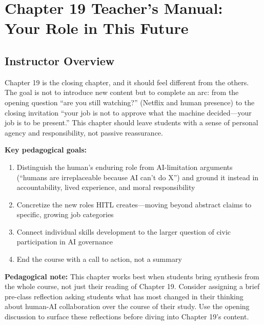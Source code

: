 
\section*{Chapter 19 Teacher's Manual: Your Role in This Future}

\subsection*{Instructor Overview}

Chapter 19 is the closing chapter, and it should feel different from the others. The goal is not to introduce new content but to complete an arc: from the opening question ``are you still watching?'' (Netflix and human presence) to the closing invitation ``your job is not to approve what the machine decided---your job is to be present.'' This chapter should leave students with a sense of personal agency and responsibility, not passive reassurance.

\textbf{Key pedagogical goals:}
\begin{enumerate}
    \item Distinguish the human's enduring role from AI-limitation arguments (``humans are irreplaceable because AI can't do X'') and ground it instead in accountability, lived experience, and moral responsibility
    \item Concretize the new roles HITL creates---moving beyond abstract claims to specific, growing job categories
    \item Connect individual skills development to the larger question of civic participation in AI governance
    \item End the course with a call to action, not a summary
\end{enumerate}

\textbf{Pedagogical note:} This chapter works best when students bring synthesis from the whole course, not just their reading of Chapter 19. Consider assigning a brief pre-class reflection asking students what has most changed in their thinking about human-AI collaboration over the course of their study. Use the opening discussion to surface these reflections before diving into Chapter 19's content.

